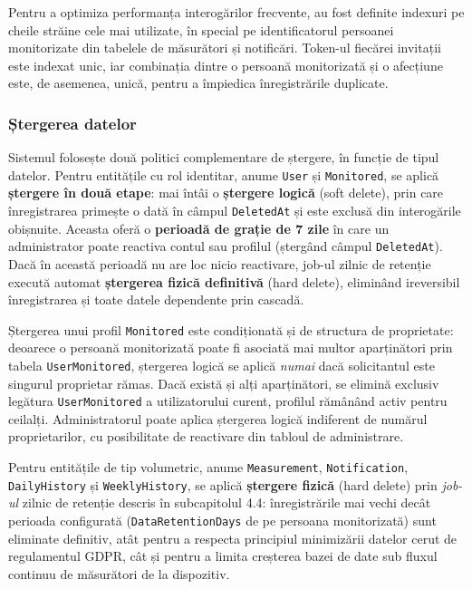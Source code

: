 \documentclass[12pt,a4paper,twoside]{article}
\begin{document}
Pentru a optimiza performanța interogărilor frecvente, au fost definite indexuri pe cheile străine cele mai utilizate, în special pe identificatorul persoanei monitorizate din tabelele de măsurători și notificări. Token-ul fiecărei invitații este indexat unic, iar combinația dintre o persoană monitorizată și o afecțiune este, de asemenea, unică, pentru a împiedica înregistrările duplicate.

\subsubsection{Ștergerea datelor}

Sistemul folosește două politici complementare de ștergere, în funcție de tipul datelor. Pentru entitățile cu rol identitar, anume \texttt{User} și \texttt{Monitored}, se aplică \textbf{ștergere în două etape}: mai întâi o \textbf{ștergere logică} (soft delete), prin care înregistrarea primește o dată în câmpul \texttt{DeletedAt} și este exclusă din interogările obișnuite. Aceasta oferă o \textbf{perioadă de grație de 7 zile} în care un administrator poate reactiva contul sau profilul (ștergând câmpul \texttt{DeletedAt}). Dacă în această perioadă nu are loc nicio reactivare, job-ul zilnic de retenție execută automat \textbf{ștergerea fizică definitivă} (hard delete), eliminând ireversibil înregistrarea și toate datele dependente prin cascadă.

Ștergerea unui profil \texttt{Monitored} este condiționată și de structura de proprietate: deoarece o persoană monitorizată poate fi asociată mai multor aparținători prin tabela \texttt{UserMonitored}, ștergerea logică se aplică \emph{numai} dacă solicitantul este singurul proprietar rămas. Dacă există și alți aparținători, se elimină exclusiv legătura \texttt{UserMonitored} a utilizatorului curent, profilul rămânând activ pentru ceilalți. Administratorul poate aplica ștergerea logică indiferent de numărul proprietarilor, cu posibilitate de reactivare din tabloul de administrare.

Pentru entitățile de tip volumetric, anume \texttt{Measurement}, \texttt{Notification}, \texttt{DailyHistory} și \texttt{WeeklyHistory}, se aplică \textbf{ștergere fizică} (hard delete) prin \textit{job-ul} zilnic de retenție descris în subcapitolul 4.4: înregistrările mai vechi decât perioada configurată (\texttt{Data\-Retention\-Days} de pe persoana monitorizată) sunt eliminate definitiv, atât pentru a respecta principiul minimizării datelor cerut de regulamentul GDPR, cât și pentru a limita creșterea bazei de date sub fluxul continuu de măsurători de la dispozitiv.
\end{document}
